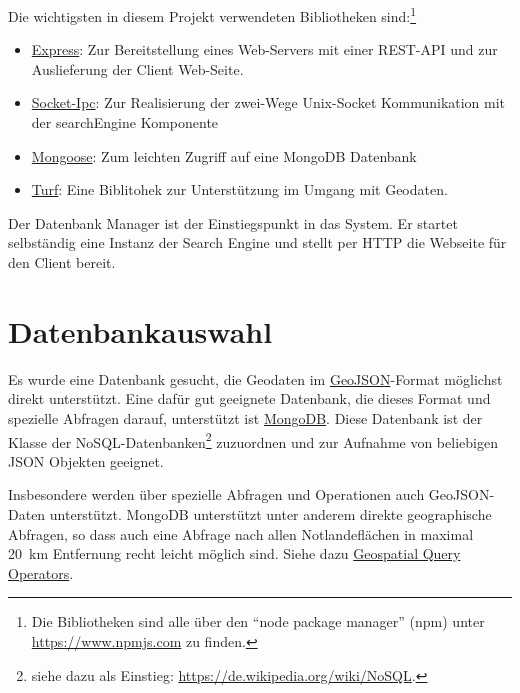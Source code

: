 \documentclass[10pt,a4paper]{report}
\begin{document}
Die wichtigsten in diesem Projekt verwendeten Bibliotheken sind:\footnote{Die Bibliotheken sind alle über den "`node package manager"' (npm) unter \href{https://www.npmjs.com}{https://www.npmjs.com} zu finden.}
\begin{itemize}
	\item \href{https://www.npmjs.com/package/express}{Express}: Zur Bereitstellung eines Web-Servers mit einer REST-API und zur Auslieferung der Client Web-Seite.
	\item \href{https://www.npmjs.com/package/socket-ipc}{Socket-Ipc}: Zur Realisierung der zwei-Wege Unix-Socket Kommunikation mit der searchEngine Komponente
	\item \href{https://www.npmjs.com/package/mongoose}{Mongoose}: Zum leichten Zugriff auf eine MongoDB Datenbank
	\item \href{https://www.npmjs.com/package/turf}{Turf}: Eine Biblitohek zur Unterstützung im Umgang mit Geodaten. 
\end{itemize}

Der Datenbank Manager ist der Einstiegspunkt in das System. Er startet selbständig eine Instanz der Search Engine und stellt per HTTP die Webseite für den Client bereit.

\section{Datenbankauswahl}

Es wurde eine Datenbank gesucht, die Geodaten im \href{http://geojson.org/}{GeoJSON}-Format möglichst direkt unterstützt. Eine dafür gut geeignete Datenbank, die dieses Format und spezielle Abfragen darauf, unterstützt ist \href{https://docs.mongodb.com/}{MongoDB}. Diese Datenbank ist der Klasse der NoSQL-Datenbanken\footnote{siehe dazu als Einstieg: \href{https://de.wikipedia.org/wiki/NoSQL}{https://de.wikipedia.org/wiki/NoSQL}.} zuzuordnen und zur Aufnahme von beliebigen JSON Objekten geeignet. 

Insbesondere werden über spezielle Abfragen und Operationen auch GeoJSON-Daten unterstützt.
MongoDB unterstützt unter anderem direkte geographische Abfragen, so dass auch eine Abfrage nach allen Notlandeflächen in maximal 20~km Entfernung recht leicht möglich sind. Siehe dazu \href{https://docs.mongodb.com/manual/reference/operator/query-geospatial/}{Geospatial Query Operators}.
\end{document}

